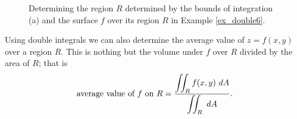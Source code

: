 \begin{example}
\begin{figure}[H]
\centering
\qquad
{}
\caption{Determining the region $R$ determined by the bounds of integration (a) and the surface $f$ over its region $R$ in Example \ref{ex_double6}.}
\end{figure}

\end{example}

	\checkoddpage
{}

Using double integrals we can also determine the average value of $z=f(x,y)$ over a region $R$. This is nothing but the volume under $f$ over $R$ divided by the area of $R$; that is
\begin{equation}
\text{average value of $f$ on $R$} = \frac{\displaystyle \iint_R f(x,y)\ dA}{\displaystyle\iint_R \ dA}.
\label{def:av_val2}
\end{equation}


